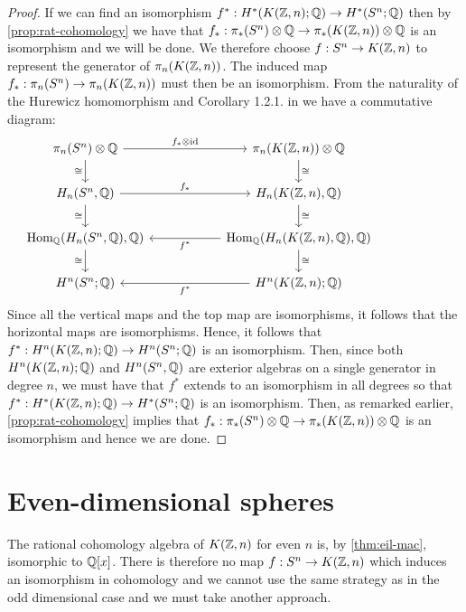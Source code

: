 \documentclass[../main.tex]{subfiles}
\begin{document}
\begin{proof}
If we can find an isomorphism \( f^*:H^*(K(\mathbb{Z}, n);\mathbb{Q}) \rightarrow 
H^*(S^n; \mathbb{Q})\) then by \cref{prop:rat-cohomology} we have that
\( f_*:\pi_*(S^n)\otimes \mathbb{Q} \rightarrow \pi_*(K(\mathbb{Z}, n))\otimes\mathbb{Q} \) is
an isomorphism and we will be done. We therefore choose \( f:S^n
\rightarrow K(\mathbb{Z}, n) \) to represent the
generator of \( \pi_n(K(\mathbb{Z}, n))\). The induced map \( f_*:\pi_n(S^n)
\rightarrow \pi_n(K(\mathbb{Z}, n))\) must then be an isomorphism. From the
naturality of the Hurewicz homomorphism and Corollary 1.2.1. in \cite[]{Moe15} 
we have a commutative diagram:
\begin{equation}
    \label{eq:big-commutative}
    \begin{tikzcd}
        {\pi_n(S^n)\otimes \Q} & {} & {\pi_n(K(\Z,n))\otimes \Q} \\
        {H_n(S^n,\Q)} && {H_n(K(\Z,n),\Q)} \\
        {\text{Hom}_\Q(H_n(S^n,\Q),\Q)} && {\text{Hom}_\Q(H_n(K(\Z,n),\Q),\Q)} && {} \\
        {H^n(S^n;\Q)} && {H^n(K(\Z,n);\Q)}
        \arrow["{f_*\otimes\text{id}}", from=1-1, to=1-3]
        \arrow["{f_*}", from=2-1, to=2-3]
        \arrow["\cong"', from=1-1, to=2-1]
        \arrow["\cong", from=1-3, to=2-3]
        \arrow["\cong"', from=2-1, to=3-1]
        \arrow["\cong", from=2-3, to=3-3]
        \arrow["{f^*}", from=3-3, to=3-1]
        \arrow["{f^*}", from=4-3, to=4-1]
        \arrow["\cong", from=3-3, to=4-3]
        \arrow["\cong"', from=3-1, to=4-1]
    \end{tikzcd}
\end{equation}
Since all the vertical maps and the top map are isomorphisms, it follows
that the horizontal maps are isomorphisms.
Hence, it follows that \( f^*:H^n(K(\mathbb{Z}, n);\mathbb{Q})\rightarrow H^n(S^n; \mathbb{Q} ) \) 
is an isomorphism.
Then, since both
\( H^n(K(\mathbb{Z}, n);\mathbb{Q}) \) and \( H^n(S^n, \mathbb{Q}) \) are exterior algebras on
a single generator in degree \( n \), we must have that \( f^* \)
extends to an isomorphism in all degrees so that \( f^*:H^*(K(\mathbb{Z}, n);
\mathbb{Q})\rightarrow H^*(S^n;\mathbb{Q})\) is an isomorphism. Then, as remarked earlier,
\cref{prop:rat-cohomology} implies that \( f_*:\pi_*(S^n)\otimes \mathbb{Q}
\rightarrow \pi_*(K(\mathbb{Z}, n))\otimes\mathbb{Q}\) is an isomorphism and hence
we are done.
\end{proof}

\section{Even-dimensional spheres}
The rational cohomology algebra of \( K(\mathbb{Z}, n) \) for even \( n \) is,
by \cref{thm:eil-mac}, isomorphic to \( \mathbb{Q}[x] \). There is therefore
no map \( f:S^n \rightarrow K(\mathbb{Z}, n) \) which induces an isomorphism
in cohomology and we cannot use the same strategy as in the odd
dimensional case and we must take another approach.
\end{document}
